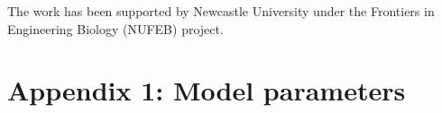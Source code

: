 \begin{acknowledgements}
The work has been supported by Newcastle University under the Frontiers in Engineering Biology (NUFEB) project.




%


\section*{Appendix 1: Model parameters}
\begin{table}[!ht] 
\caption{List of IB model parameters}\label{mytab1}
\centering
{}
\end{table}
\end{acknowledgements}
